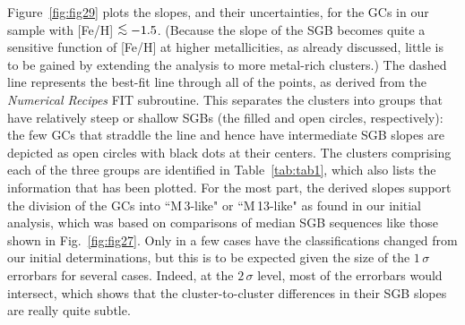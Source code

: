 \documentclass[12pt,preprint]{aastex}
\newcommand\lta{\mathrel{\hbox{\raise 0.6 ex \hbox{$<$}\kern
                   -1.8 ex\lower .5 ex\hbox{$\sim$}}}}
\begin{document}
Figure~\ref{fig:fig29} plots the slopes, and their uncertainties, for the GCs in
our sample with [Fe/H] $\lta -1.5$.  (Because the slope of the SGB becomes quite
a sensitive function of [Fe/H] at higher metallicities, as already discussed,
little is to be gained by extending the analysis to more metal-rich clusters.)
The dashed line represents the best-fit line through all of the points, as 
derived from the {\it Numerical Recipes} FIT subroutine.  This separates the
clusters into groups that have relatively steep or shallow SGBs (the filled and
open circles, respectively): the few GCs that straddle the line and hence have
intermediate SGB slopes are depicted as open circles with black dots at their
centers.  The clusters comprising each of the three groups are identified in
Table~\ref{tab:tab1}, which also lists the information that has been plotted.
For the most part, the derived slopes support the division of the GCs into
``M$\,$3-like" or ``M$\,$13-like" as found in our initial analysis, which was
based on comparisons of median SGB sequences like those shown in
Fig.~\ref{fig:fig27}.  Only in a few cases have the classifications changed from
our initial determinations, but this is to be expected given the size of the
$1\,\sigma$ errorbars for several cases.  Indeed, at the $2\,\sigma$ level,
most of the errorbars would intersect, which shows that the cluster-to-cluster
differences in their SGB slopes are really quite subtle.

\end{document}
